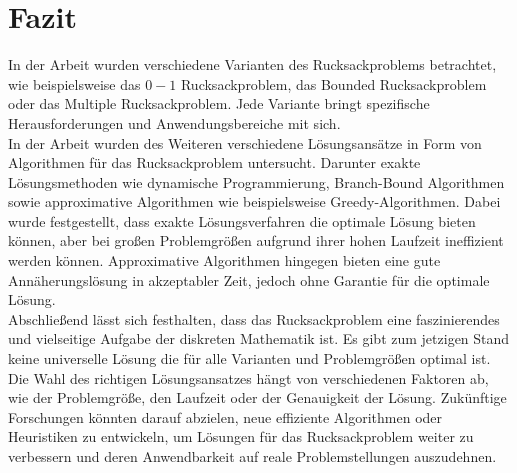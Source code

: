 \chapter{Fazit}

In der Arbeit wurden verschiedene Varianten des Rucksackproblems betrachtet,
wie beispielsweise das $0-1$ Rucksackproblem, das Bounded Rucksackproblem oder das Multiple Rucksackproblem. 
Jede Variante bringt spezifische Herausforderungen und Anwendungsbereiche mit sich.
\\
In der Arbeit wurden des Weiteren verschiedene Lösungsansätze
in Form von Algorithmen für das Rucksackproblem untersucht.
Darunter exakte Lösungsmethoden wie dynamische Programmierung, Branch-Bound Algorithmen 
sowie approximative Algorithmen wie beispielsweise Greedy-Algorithmen. 
Dabei wurde festgestellt, dass exakte Lösungsverfahren die optimale Lösung bieten können, 
aber bei großen Problemgrößen aufgrund ihrer hohen Laufzeit ineffizient werden können. 
Approximative Algorithmen hingegen bieten eine gute Annäherungslösung in akzeptabler Zeit, 
jedoch ohne Garantie für die optimale Lösung.
\\

Abschließend lässt sich festhalten, dass das Rucksackproblem eine faszinierendes und vielseitige Aufgabe der diskreten Mathematik ist.
Es gibt zum jetzigen Stand keine universelle Lösung die für alle Varianten und Problemgrößen optimal ist. 
Die Wahl des richtigen Lösungsansatzes hängt von verschiedenen Faktoren ab, wie der Problemgröße, den Laufzeit oder der Genauigkeit der Lösung. 
Zukünftige Forschungen könnten darauf abzielen, neue effiziente Algorithmen oder Heuristiken zu entwickeln,
um Lösungen für das Rucksackproblem weiter zu verbessern und deren Anwendbarkeit auf reale Problemstellungen auszudehnen.